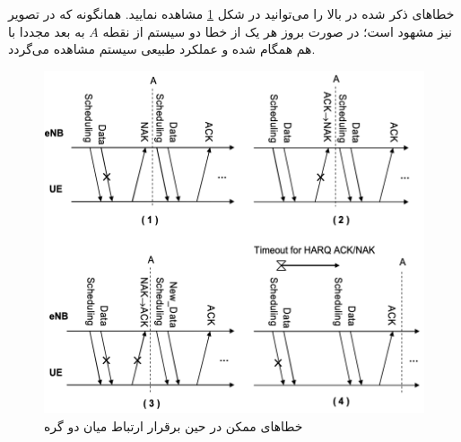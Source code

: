 \par
خطاهای ذکر شده در بالا را می‌توانید در شکل \ref{fig:cdd-errors} مشاهده نمایید. همانگونه که در تصویر نیز مشهود است؛ در صورت بروز هر یک از خطا دو سیستم از نقطه $A$ به بعد مجددا با هم همگام شده و عملکرد طبیعی سیستم مشاهده می‌گردد.

\begin{figure}
	\centering
	\includegraphics[width=0.8\linewidth]{figs/cdd-errors}
	\caption {خطاهای ممکن در حین برقرار ارتباط میان دو گره}
	\label{fig:cdd-errors}
\end{figure}

